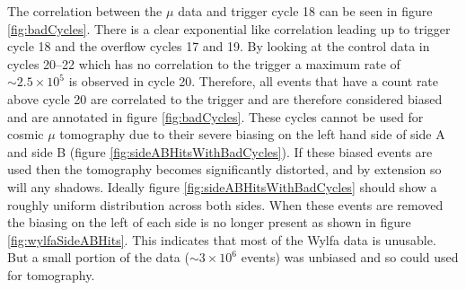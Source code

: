
The correlation between the $\mu$ data and trigger cycle 18 can be seen in figure \ref{fig:badCycles}. There is a clear exponential like correlation leading up to trigger cycle 18 and the overflow cycles 17 and 19. By looking at the control data in cycles 20--22 which has no correlation to the trigger a maximum rate of $\sim 2.5 \times 10^5$ is observed in cycle 20. Therefore, all events that have a count rate above cycle 20 are correlated to the trigger and are therefore considered biased and are annotated in figure \ref{fig:badCycles}. These cycles cannot be used for cosmic $\mu$ tomography due to their severe biasing on the left hand side of side A and side B (figure \ref{fig:sideABHitsWithBadCycles}). If these biased events are used then the tomography becomes significantly distorted, and by extension so will any shadows. Ideally figure \ref{fig:sideABHitsWithBadCycles} should show a roughly uniform distribution across both sides. When these events are removed the biasing on the left of each side is no longer present as shown in figure \ref{fig:wylfaSideABHits}. This indicates that most of the Wylfa data is unusable. But a small portion of the data ($\sim 3 \times 10^6$ events) was unbiased and so could used for tomography. 



